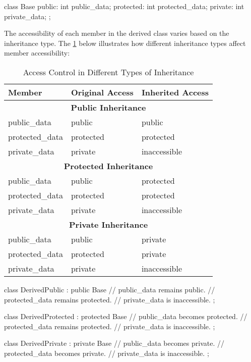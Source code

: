 \begin{codeblock}[language=C++]
class Base {
public:
    int public_data;
protected:
    int protected_data;
private:
    int private_data;
};
\end{codeblock}

\vspace{1em}

The accessibility of each member in the derived class varies based on the inheritance type. The \cref{tab:inheritance_access} below illustrates how different inheritance types affect member accessibility:

\renewcommand{\arraystretch}{1}  %
\begin{table}[H]
    \centering
    \small
    \begin{tabular}{|p{3.5cm}|p{3.5cm}|p{3.5cm}|}
        \hline
        \textbf{Member} & \textbf{Original Access} & \textbf{Inherited Access} \\
        \hline
        \multicolumn{3}{|c|}{\textbf{Public Inheritance}} \\
        \hline
        public\_data & public & public \\
        protected\_data & protected & protected \\
        private\_data & private & inaccessible \\
        \hline
        \multicolumn{3}{|c|}{\textbf{Protected Inheritance}} \\
        \hline
        public\_data & public & protected \\
        protected\_data & protected & protected \\
        private\_data & private & inaccessible \\
        \hline
        \multicolumn{3}{|c|}{\textbf{Private Inheritance}} \\
        \hline
        public\_data & public & private \\
        protected\_data & protected & private \\
        private\_data & private & inaccessible \\
        \hline
    \end{tabular}
    \caption{Access Control in Different Types of Inheritance}
    \label{tab:inheritance_access}
\end{table}

\begin{codeblock}[language=C++]
class DerivedPublic : public Base { 
    // public_data remains public.
    // protected_data remains protected.
    // private_data is inaccessible.
};

class DerivedProtected : protected Base { 
    // public_data becomes protected.
    // protected_data remains protected.
    // private_data is inaccessible.
};

class DerivedPrivate : private Base { 
    // public_data becomes private.
    // protected_data becomes private.
    // private_data is inaccessible.
};
\end{codeblock}


